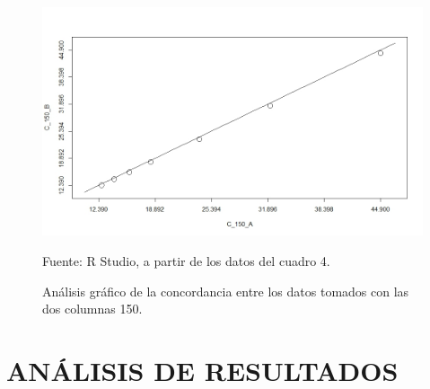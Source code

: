 \documentclass[12pt, letterpaper]{article}
\begin{document}
\begin{landscape}
\begin{figure}[H]
	\centering
	\includegraphics[width=1\columnwidth]{figura_6.png}
	\caption{Análisis gráfico de la concordancia entre los datos tomados con las dos columnas 150.}
	Fuente: R Studio, a partir de los datos del cuadro 4.
    \label{figura6}
\end{figure}

\end{landscape}

\section{ANÁLISIS DE RESULTADOS}
\end{document}

